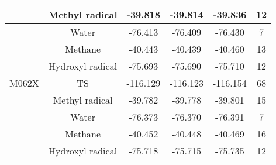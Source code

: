 \begin{tabular}{|c|c|c|c|c|c|}
                                                                                   & Methyl radical                       & -39.818                             & -39.814                            & -39.836                            & 12               \\ \hline
                                                                                   & Water                                & -76.413                             & -76.409                            & -76.430                            & 7                \\ \hline
                                                                                   & Methane                              & -40.443                             & -40.439                            & -40.460                            & 13               \\ \hline
                                                                                   & Hydroxyl radical                     & -75.693                             & -75.690                            & -75.710                            & 12               \\ \hline
    \multicolumn{1}{|c|}{M062X}                                                    & TS                                   & -116.129                            & -116.123                           & -116.154                           & 68               \\ \hline
                                                                                   & Methyl radical                       & -39.782                             & -39.778                            & -39.801                            & 15               \\ \hline
                                                                                   & Water                                & -76.373                             & -76.370                            & -76.391                            & 7                \\ \hline
                                                                                   & Methane                              & -40.452                             & -40.448                            & -40.469                            & 16               \\ \hline
                                                                                   & Hydroxyl radical                     & -75.718                             & -75.715                            & -75.735                            & 12               \\ \hline

\end{tabular}
